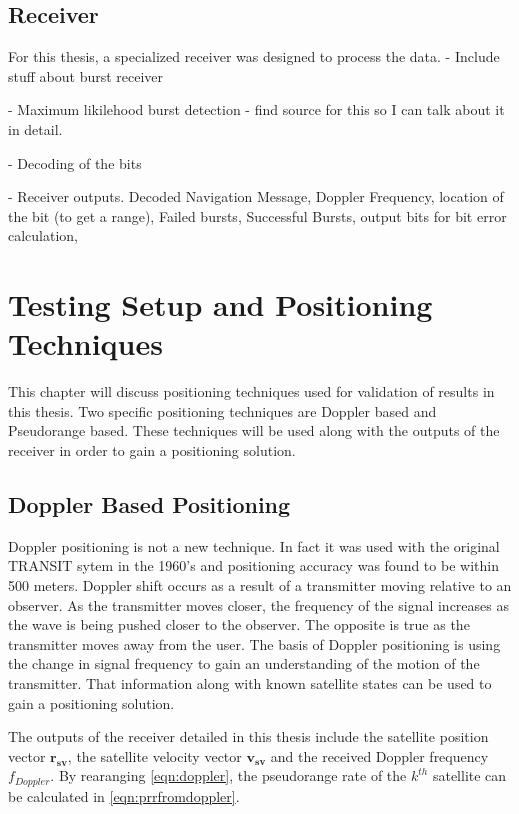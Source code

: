 \documentclass[12pt]{report}
\begin{document}
\section{Receiver}
For this thesis, a specialized receiver was designed to process the data. 
- Include stuff about burst receiver

- Maximum likilehood burst detection
    - find source for this so I can talk about it in detail.

- Decoding of the bits

- Receiver outputs. Decoded Navigation Message, Doppler Frequency, location of the bit (to get a range), Failed bursts, Successful Bursts, output bits for bit error calculation,

\chapter{Testing Setup and Positioning Techniques}
This chapter will discuss positioning techniques used for validation of results in this thesis. Two specific positioning techniques are Doppler based and Pseudorange based. These techniques will be used along with the outputs of the receiver in order to gain a positioning solution.
 
\section{Doppler Based Positioning} \label{sec:DopplerPosTechnique}
Doppler positioning is not a new technique. In fact it was used with the original TRANSIT sytem in the 1960's and positioning accuracy was found to be within 500 meters. Doppler shift occurs as a result of a transmitter moving relative to an observer. As the transmitter moves closer, the frequency of the signal increases as the wave is being pushed closer to the observer. The opposite is true as the transmitter moves away from the user. The basis of Doppler positioning is using the change in signal frequency to gain an understanding of the motion of the transmitter. That information along with known satellite states can be used to gain a positioning solution.

The outputs of the receiver detailed in this thesis include the satellite position vector $\mathbf{r_{sv}}$, the satellite velocity vector $\mathbf{v_{sv}}$ and the received Doppler frequency $f_{Doppler}$. By rearanging \ref{eqn:doppler}, the pseudorange rate of the $k^{th}$ satellite can be calculated in \ref{eqn:prrfromdoppler}.
\end{document}
